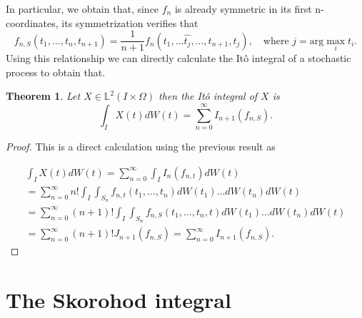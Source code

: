 \documentclass[12pt]{article}
\newtheorem{theorem}{Theorem}
\begin{document}
In particular, we obtain that, since $f_n$ is already symmetric in its first n-coordinates, its symmetrization verifies that
\begin{equation*}
    f_{n,S}(t_1,\ldots,t_n,t_{n+1})=\frac{1}{n+1}f_n(t_1,\ldots\hat{t_{j}},\ldots,t_{n+1},t_j),\quad \text{where } j=\text{arg}\max_i t_i.
\end{equation*}
Using this relationship we can directly calculate the Itô integral of a stochastic process to obtain that.
\begin{theorem}
    Let $X \in \mathbb{L}^2(I\times\Omega)$ then the Itô integral of $X$ is
    \begin{equation*}
    	\int_{I} X(t) dW(t)=\sum_{n=0}^{\infty} I_{n+1}(f_{n,S}).
    \end{equation*}
\end{theorem}
\begin{proof}
    This is a direct calculation using the previous result as


    \begin{multline*}
    	\int_{I} X(t) dW(t)=\sum_{n=0}^{\infty}\int_{I} I_n(f_{n,t})dW(t)\\=\sum_{n=0}^{\infty}n! \int_{I}\int_{S_n}f_{n,t}(t_1,\ldots,t_n) dW(t_1)\ldots dW(t_n) dW(t)\\=\sum_{n=0}^{\infty}(n+1)! \int_{I}\int_{S_n}f_{n,S}(t_1,\ldots,t_n,t) dW(t_1)\ldots dW(t_n) dW(t)\\=\sum_{n=0}^{\infty}(n+1)! J_{n+1}(f_{n,S}) =\sum_{n=0}^{\infty}  I_{n+1}(f_{n,S}).
    \end{multline*}

\end{proof}
\section{The Skorohod integral}%
\end{document}
